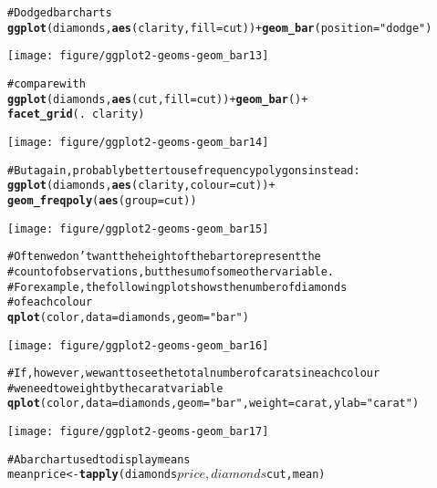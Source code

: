 \documentclass[a4paper,titlepage]{tufte-handout}\usepackage{graphicx, color}
\makeatletter
\def\maxwidth{ %
  \ifdim\Gin@nat@width>\linewidth
    \linewidth
  \else
    \Gin@nat@width
  \fi
}
\newcommand{\hlfunctioncall}[1]{\textcolor[rgb]{0.501960784313725,0,0.329411764705882}{\textbf{#1}}}%
\newcommand{\hlstring}[1]{\textcolor[rgb]{0.6,0.6,1}{#1}}%
\newcommand{\hlcomment}[1]{\textcolor[rgb]{0.180392156862745,0.6,0.341176470588235}{#1}}%
\newenvironment{kframe}{%
 \def\at@end@of@kframe{}%
 \ifinner\ifhmode%
  \def\at@end@of@kframe{\end{minipage}}%
  \begin{minipage}{\columnwidth}%
 \fi\fi%
 \def\FrameCommand##1{\hskip\@totalleftmargin \hskip-\fboxsep
 \colorbox{shadecolor}{##1}\hskip-\fboxsep
     \hskip-\linewidth \hskip-\@totalleftmargin \hskip\columnwidth}%
 \MakeFramed {\advance\hsize-\width
   \@totalleftmargin\z@ \linewidth\hsize
   \@setminipage}}%
 {\par\unskip\endMakeFramed%
 \at@end@of@kframe}
\newenvironment{knitrout}{}{} %
\makeatother
\begin{document}
\begin{knitrout}
\begin{kframe}
\begin{alltt}
\hlcomment{# Dodged bar charts}
\hlfunctioncall{ggplot}(diamonds, \hlfunctioncall{aes}(clarity, fill=cut)) + \hlfunctioncall{geom_bar}(position=\hlstring{"dodge"})
\end{alltt}
\end{kframe}\texttt{[image: figure/ggplot2-geoms-geom\_bar13]} \begin{kframe}\begin{alltt}
\hlcomment{# compare with}
\hlfunctioncall{ggplot}(diamonds, \hlfunctioncall{aes}(cut, fill=cut)) + \hlfunctioncall{geom_bar}() +
  \hlfunctioncall{facet_grid}(. ~ clarity)
\end{alltt}
\end{kframe}\texttt{[image: figure/ggplot2-geoms-geom\_bar14]} \begin{kframe}\begin{alltt}
\hlcomment{# But again, probably better to use frequency polygons instead:}
\hlfunctioncall{ggplot}(diamonds, \hlfunctioncall{aes}(clarity, colour=cut)) +
  \hlfunctioncall{geom_freqpoly}(\hlfunctioncall{aes}(group = cut))
\end{alltt}
\end{kframe}\texttt{[image: figure/ggplot2-geoms-geom\_bar15]} \begin{kframe}\begin{alltt}
\hlcomment{# Often we don't want the height of the bar to represent the}
\hlcomment{# count of observations, but the sum of some other variable.}
\hlcomment{# For example, the following plot shows the number of diamonds}
\hlcomment{# of each colour}
\hlfunctioncall{qplot}(color, data=diamonds, geom=\hlstring{"bar"})
\end{alltt}
\end{kframe}\texttt{[image: figure/ggplot2-geoms-geom\_bar16]} \begin{kframe}\begin{alltt}
\hlcomment{# If, however, we want to see the total number of carats in each colour}
\hlcomment{# we need to weight by the carat variable}
\hlfunctioncall{qplot}(color, data=diamonds, geom=\hlstring{"bar"}, weight=carat, ylab=\hlstring{"carat"})
\end{alltt}
\end{kframe}\texttt{[image: figure/ggplot2-geoms-geom\_bar17]} \begin{kframe}\begin{alltt}
\hlcomment{# A bar chart used to display means}
meanprice <- \hlfunctioncall{tapply}(diamonds$price, diamonds$cut, mean)

\end{alltt}
\end{kframe}
\end{knitrout}
\end{document}
